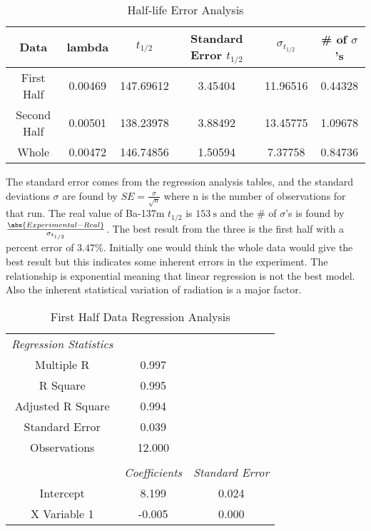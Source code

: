 \documentclass[11pt]{article}
\begin{document}
	\begin{table}[htbp]
		\centering
		\caption{Half-life Error Analysis}
		\begin{tabular}{cccccc}
			\toprule
			Data & lambda & $t_{1/2}$ & Standard Error $t_{1/2}$ & $\sigma_{t_{1/2}}$ & \# of $\sigma$'s \\
			\midrule
			First Half & 0.00469 & 147.69612 & 3.45404 & 11.96516 & 0.44328 \\
			Second Half & 0.00501 & 138.23978 & 3.88492 & 13.45775 & 1.09678 \\
			Whole  & 0.00472 & 146.74856 & 1.50594 & 7.37758 & 0.84736 \\
			\bottomrule
		\end{tabular}%
		\label{tab:13_Table_2}%
	\end{table}%
	
	The standard error comes from the regression analysis tables, and the standard deviations $\sigma$ are found by $SE = \frac{\sigma}{\sqrt{n}}$ where n is the number of observations for that run. The real value of Ba-137m $t_{1/2}$ is $\qty{153}{\second}$ and the \# of $\sigma$'s is found by $\frac{\abs{Experimental - Real}}{\sigma_{t_{1/2}}}$. The best result from the three is the first half with a percent error of $3.47\%$. Initially one would think the whole data would give the best result but this indicates some inherent errors in the experiment. The relationship is exponential meaning that linear regression is not the best model. Also the inherent statistical variation of radiation is a major factor.
	
	\begin{table}[htbp]
		\centering
		\caption{First Half Data Regression Analysis}
		\begin{tabular}{ccc}
			\cmidrule{1-2}    \textit{Regression Statistics} &   &  \\
			\cmidrule{1-2}    Multiple R & 0.997 &  \\
			R Square & 0.995 &  \\
			Adjusted R Square & 0.994 &  \\
			Standard Error & 0.039 &  \\
			Observations & 12.000 &  \\
			\cmidrule{1-2}      &   &  \\
			\midrule
			& \textit{Coefficients} & \textit{Standard Error} \\
			\midrule
			Intercept & 8.199 & 0.024 \\
			X Variable 1 & -0.005 & 0.000 \\
			\bottomrule
		\end{tabular}%
		\label{tab:13_Table_3}%
	\end{table}%
	
\end{document}
